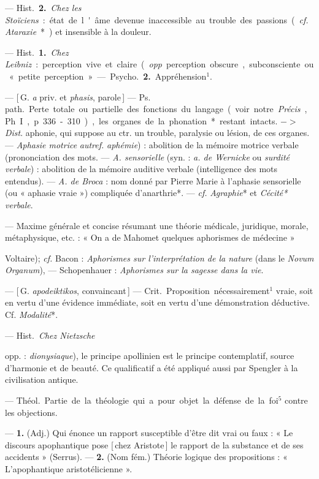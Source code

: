 \begin{itemize}[leftmargin=1cm, label=, itemsep=1pt]
{— \si{Hist.} {\bf 2.} {\it Chez les Stoïciens} : état
de l'âme devenue inaccessible au
trouble des passions ({\it cf.}  {\it Ataraxie}*)}
et insensible à la douleur.

 — \si{Hist.} {\bf 1.} {\it Chez Leibniz} :
perception vive et claire ({\it opp}. perception obscure, subconsciente ou
« petite perception ». — \si{Psycho.}
 {\bf 2.} Appréhension$^1$.

 — [\,G. {\it a} priv. et {\it phasis}, parole\,]
— \si{Ps. path.} Perte totale ou partielle des fonctions du langage (voir
notre {\it Précis}, Ph. I, p. 336-310), les
organes de la phonation* restant
intacts. $->$ {\it Dist}. aphonie, qui suppose au ctr. un trouble, paralysie ou
lésion, de ces organes. — {\it Aphasie
motrice} {{\it autref.} {\it aphémie}) : abolition
de la mémoire motrice verbale (prononciation des mots}. — {\it A.
sensorielle} (syn. : {\it a. de Wernicke} ou {\it surdité verbale}) :
abolition de la mémoire
auditive verbale (intelligence des
mots entendus). — {\it A. de Broca} :
nom donné par Pierre Marie à
l'aphasie sensorielle (ou « aphasie
vraie ») compliquée d’anarthrie*. —
{\it cf.}  {\it Agraphie}* et {\it Cécité* verbale}.

 — Maxime générale et
concise résumant une théorie médicale, juridique, morale,
métaphysique, etc. : « On a de Mahomet quelques aphorismes
de médecine » {Voltaire); {\it cf.}  Bacon : {\it Aphorismes sur
l'interprétation de la nature} (dans le
{\it Novum Organum}), — Schopenhauer :
{\it Aphorismes sur la sagesse dans la vie}.

 — [\,G. {\it apodeiktikos}, convaincant\,] — \si{Crit.}
Proposition nécessairement$^1$ vraie,
soit en vertu d’une évidence immédiate, soit en vertu d’une
démonstration déductive. Cf.  {\it Modalité}*.

 — \si{Hist.} {\it Chez Nietzsche}
{opp. : {\it dionysiaque}), le principe
apollinien est le principe contemplatif, source d'harmonie et de
beauté. Ce qualificatif a été appliqué
aussi par Spengler à la civilisation
antique.

 — \si{Théol.} Partie de la
théologie qui a pour objet la défense
de la foi$^5$ contre les objections.

 — {\bf 1.} (Adj.) Qui énonce
un rapport susceptible d'être dit vrai
ou faux : « Le discours apophantique
pose [\,chez Aristote\,] le rapport de la
substance et de ses accidents » (Serrus). — {\bf 2.} (Nom fém.) Théorie
logique des propositions : « L’apophantique aristotélicienne ».

}}
\end{itemize}
